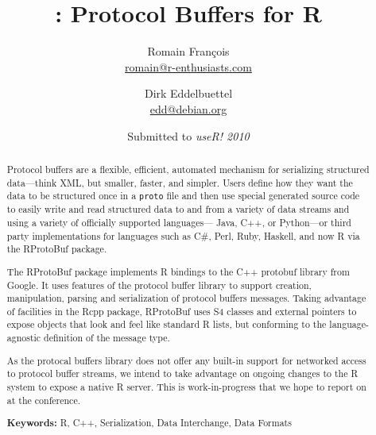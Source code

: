 \documentclass[11pt]{article}
\author{
Romain Fran\c{c}ois\\ {\small \url{romain@r-enthusiasts.com} } \and
Dirk Eddelbuettel\\ {\small \url{edd@debian.org} }
}
\title{\pkg{RProtoBuf}: Protocol Buffers for R }
\date{Submitted to \textsl{useR! 2010}}
\newcommand{\proglang}[1]{\textsf{#1}}
\newcommand{\pkg}[1]{{\fontseries{b}\selectfont #1}}
\begin{document}
\maketitle
\thispagestyle{empty}
\begin{abstract}
  \addtolength{\parskip}{\baselineskip} 	%
  \noindent %
  Protocol buffers are a flexible, efficient, automated mechanism for
  serializing structured data---think XML, but smaller, faster, and simpler.
  Users define how they want the data to be structured once in a
  \texttt{proto} file and then use special generated source code to easily
  write and read structured data to and from a variety of data streams and
  using a variety of officially supported languages--- \proglang{Java},
  \proglang{C++}, or \proglang{Python}---or third party implementations for
  languages such as \proglang{C\#}, \proglang{Perl}, \proglang{Ruby},
  \proglang{Haskell}, and now \proglang{R} via the \pkg{RProtoBuf} package.
  
  The \pkg{RProtoBuf} package implements \proglang{R} bindings to the
  \proglang{C++} protobuf library from Google. It uses features of the
  protocol buffer library to support creation, manipulation, parsing and
  serialization of protocol buffers messages. Taking advantage of facilities
  in the \pkg{Rcpp} package, \pkg{RProtoBuf} uses S4 classes and external
  pointers to expose objects that look and feel like standard \proglang{R}
  lists, but conforming to the language-agnostic definition of the message
  type.

  As the protocal buffers library does not offer any built-in support
  for networked access to protocol buffer streams, we intend to take
  advantage on ongoing changes to the \proglang{R} system to expose a native
  \proglang{R} server. This is work-in-progress that we hope to report on at
  the conference.

  \noindent \textbf{Keywords:}  
  \proglang{R}, \proglang{C++}, Serialization, Data Interchange, Data Formats
\end{abstract}
\end{document}
